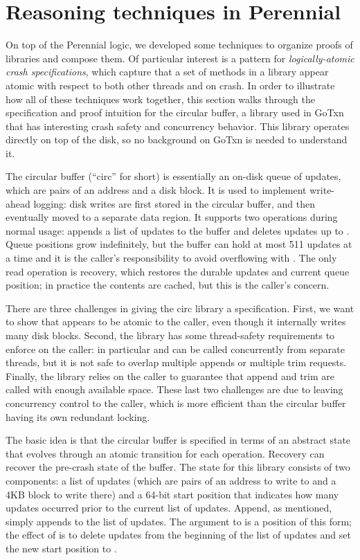 \section{Reasoning techniques in Perennial}
\label{sec:perennial:techniques}

On top of the Perennial logic, we developed some techniques to organize proofs
of libraries and compose them. Of particular interest is a pattern for
\emph{logically-atomic crash specifications}, which capture that a set of
methods in a library appear atomic with respect to both other threads and on
crash. In order to illustrate how all of these techniques work together, this
section walks through the specification and proof intuition for the circular
buffer, a library used in GoTxn that has interesting crash safety and
concurrency behavior. This library operates directly on top of the disk, so no
background on GoTxn is needed to understand it.

The circular buffer (``circ'' for short) is essentially an on-disk queue of
updates, which are pairs of an address and a disk block. It is used to implement
write-ahead logging: disk writes are first stored in the circular buffer, and
then eventually moved to a separate data region. It supports two operations
during normal usage:  appends a list of updates to the buffer
and  deletes updates up to . Queue positions grow
indefinitely, but the buffer can hold at most 511 updates at a time and it
is the caller's responsibility to avoid overflowing with . The only
read operation is recovery, which restores the durable updates and current queue
position; in practice the contents are cached, but this is the caller's concern.

There are three challenges in giving the circ library a specification. First, we
want to show that  appears to be atomic to the caller, even though it
internally writes many disk blocks. Second, the library has some thread-safety
requirements to enforce on the caller: in particular  and
 can be called concurrently from separate threads, but it is not
safe to overlap multiple appends or multiple trim requests. Finally, the library
relies on the caller to guarantee that append and trim are called with enough
available space. These last two challenges are due to leaving concurrency
control to the caller, which is more efficient than the circular buffer having
its own redundant locking.

The basic idea is that the circular buffer is specified in terms of an abstract
state that evolves through an atomic transition for each operation. Recovery can
recover the pre-crash state of the buffer. The state for this library consists
of two components: a list of updates (which are pairs of an address to write to
and a 4KB block to write there) and a 64-bit start position that indicates how
many updates occurred prior to the current list of updates. Append, as
mentioned, simply appends to the list of updates. The argument to 
is a position of this form; the effect of  is to delete
 updates from the beginning of the list of updates and set the
new start position to .

